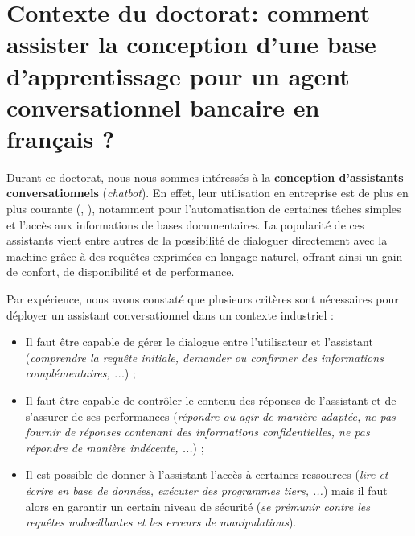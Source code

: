 \section{Contexte du doctorat: comment assister la conception d'une base d'apprentissage pour un agent conversationnel bancaire en français ?}
\label{section:2.4-CONTEXTE-DOCTORAT}

	Durant ce doctorat, nous nous sommes intéressés à la \textbf{conception d'assistants conversationnels} (\textit{chatbot}).
	En effet, leur utilisation en entreprise est de plus en plus courante (\cite{goasduff:2019:chatbots-will-appeal}, \cite{costello-lodolce:2022:gartner-predicts-chatbots}), notamment pour l'automatisation de certaines tâches simples et l'accès aux informations de bases documentaires.
	La popularité de ces assistants vient entre autres de la possibilité de dialoguer directement avec la machine grâce à des requêtes exprimées en langage naturel, offrant ainsi un gain de confort, de disponibilité et de performance.
	
	Par expérience, nous avons constaté que plusieurs critères sont nécessaires pour déployer un assistant conversationnel dans un contexte industriel :
	\begin{itemize}
		\item Il faut être capable de gérer le dialogue entre l'utilisateur et l'assistant (\textit{comprendre la requête initiale, demander ou confirmer des informations complémentaires, ...}) ;
		\item Il faut être capable de contrôler le contenu des réponses de l'assistant et de s'assurer de ses performances (\textit{répondre ou agir de manière adaptée, ne pas fournir de réponses contenant des informations confidentielles, ne pas répondre de manière indécente, ...}) ;
		\item Il est possible de donner à l'assistant l'accès à certaines ressources (\textit{lire et écrire en base de données, exécuter des programmes tiers, ...}) mais il faut alors en garantir un certain niveau de sécurité (\textit{se prémunir contre les requêtes malveillantes et les erreurs de manipulations}).
	\end{itemize}
	

